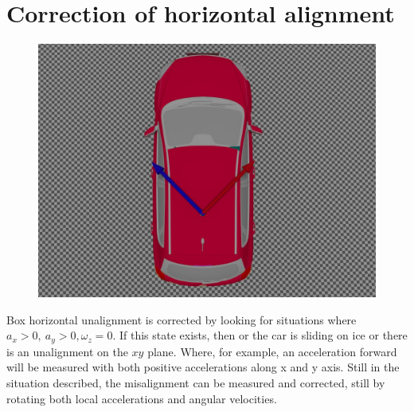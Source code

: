 \section{Correction of horizontal alignment}
\begin{figure}[H]
\includegraphics[width=\textwidth]{kia_bad_xy_align.jpg}
\end{figure}
Box horizontal unalignment is corrected by looking for situations where $a_x>0, \ a_y>0, \omega_z =0$. If this state exists, then or the car is sliding on ice or there is an unalignment on the $xy$ plane. Where, for example, an acceleration forward will be measured with both positive accelerations along x and y axis. 
Still in the situation described, the misalignment can be measured and corrected, still by rotating both local accelerations and angular velocities.

